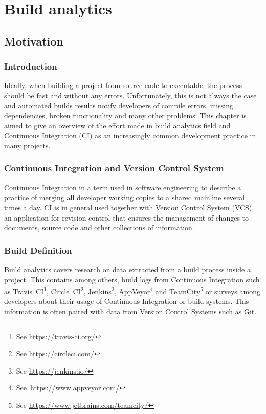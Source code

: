 \documentclass[]{book}
\let\rmarkdownfootnote\footnote%
\def\footnote{\protect\rmarkdownfootnote}
\begin{document}
\chapter{Build analytics}\label{build-analytics}

\section{Motivation}\label{motivation-1}

\subsection{Introduction}\label{introduction}

Ideally, when building a project from source code to executable, the
process should be fast and without any errors. Unfortunately, this is
not always the case and automated builds results notify developers of
compile errors, missing dependencies, broken functionality and many
other problems. This chapter is aimed to give an overview of the effort
made in build analytics field and Continuous Integration (CI) as an
increasingly common development practice in many projects.

\subsection{Continuous Integration and Version Control
System}\label{continuous-integration-and-version-control-system}

Continuous Integration in a term used in software engineering to
describe a practice of merging all developer working copies to a shared
mainline several times a day. CI is in general used together with
Version Control System (VCS), an application for revision control that
ensures the management of changes to documents, source code and other
collections of information.

\subsection{Build Definition}\label{build-definition}

Build analytics covers research on data extracted from a build process
inside a project. This contains among others, build logs from Continuous
Integration such as Travis~CI\footnote{See \url{https://travis-ci.org/}},
Circle~CI\footnote{See \url{https://circleci.com/}}, Jenkins\footnote{See
  \url{https://jenkins.io/}}, AppVeyor\footnote{See~\url{https://www.appveyor.com/}}
and TeamCity\footnote{See \url{https://www.jetbrains.com/teamcity/}} or
surveys among developers about their usage of Continuous Integration or
build systems. This information is often paired with data from Version
Control Systems such as Git.
\end{document}
